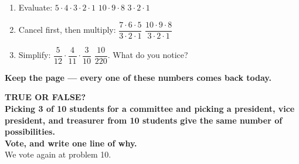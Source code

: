\documentclass[aspectratio=169, 11pt]{beamer}
\begin{document}
\begin{frame}[t, plain]
  \vspace{0.3cm}
  \begin{center}
    \begin{minipage}{0.86\textwidth}
      \begin{enumerate}\setlength{\itemsep}{10pt}
        \item Evaluate: \quad $5 \cdot 4 \cdot 3 \cdot 2 \cdot 1$ \qquad $10 \cdot 9 \cdot 8$
              \qquad $3 \cdot 2 \cdot 1$
        \item Cancel first, then multiply: \quad $\dfrac{7 \cdot 6 \cdot 5}{3 \cdot 2 \cdot 1}$
              \qquad $\dfrac{10 \cdot 9 \cdot 8}{3 \cdot 2 \cdot 1}$
        \item Simplify: \quad $\dfrac{5}{12} \cdot \dfrac{4}{11} \cdot \dfrac{3}{10}$ \qquad
              $\dfrac{10}{220}$. What do you notice?
      \end{enumerate}
    \end{minipage}
  \end{center}
  \vspace{0.3cm}
  \begin{center}
    {\color{cerulean}\bfseries Keep the page --- every one of these numbers comes back today.}
  \end{center}
\end{frame}

{
\begin{frame}[plain]
  \vspace{1.1cm}
  \begin{center}
    {\color{frostmid}\bfseries\small TRUE OR FALSE?}\\[0.6cm]
    {\color{white}\bfseries\large Picking 3 of 10 students for a committee and picking a
    president, vice president, and treasurer from 10 students give the same number of
    possibilities.}\\[0.8cm]
    {\color{goldacc}\bfseries\large Vote, and write one line of why.}\\[0.4cm]
    {\color{frostmid}\small We vote again at problem 10.}
  \end{center}
\end{frame}
}
\end{document}
